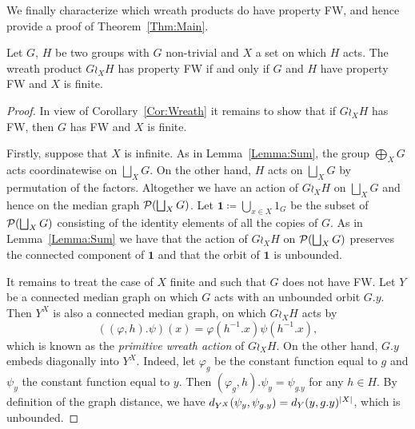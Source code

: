 We finally characterize which wreath products do have property FW, and hence provide a proof of Theorem~\ref{Thm:Main}.
\begin{prop}\label{Prop:Median}
Let $G$, $H$ be two groups with $G$ non-trivial and $X$ a set on which $H$ acts. The wreath product $G \wr_X H$ has property FW if and only if $G$ and $H$ have property FW and $X$ is finite.
\end{prop}
\begin{proof}
In view of Corollary~\ref{Cor:Wreath} it remains to show that if $G\wr_X H$ has FW, then $G$ has FW and $X$ is finite.

Firstly, suppose that $X$ is infinite.
As in Lemma~\ref{Lemma:Sum}, the group $\bigoplus_XG$ acts coordinatewise on  $\bigsqcup_XG$. On the other hand, $H$ acts on $\bigsqcup_XG$ by permutation of the factors.
Altogether we have an action of $G\wr_XH$ on $\bigsqcup_XG$ and hence on the median graph $\mathcal P(\bigsqcup_XG)$.
Let $\mathbf 1\coloneqq\bigcup_{x\in X} 1_{G}$ be the subset of $\mathcal P(\bigsqcup_XG)$ consisting of the identity elements of all the copies of $G$.
As in Lemma~\ref{Lemma:Sum} we have that the action of $G\wr_XH$ on $\mathcal P(\bigsqcup_XG)$ preserves the connected component of $\mathbf 1$
and that the orbit of $\mathbf 1$ is unbounded.

It remains to treat the case of $X$ finite and such that $G$ does not have FW.
Let $Y$ be a connected median graph on which $G$ acts with an unbounded orbit $G.y$.
Then $Y^X$ is also a connected median graph, on which $G\wr_XH$ acts by
\[
((\varphi,h).\psi)(x)=\varphi(h^{-1}.x)\psi(h^{-1}.x),
\]
which is known as the \emph{primitive wreath action} of $G\wr_XH$.
On the other hand, $G.y$ embeds diagonally into $Y^X$.
Indeed, let $\varphi_g$ be the constant function equal to $g$ and $\psi_y$ the constant function equal to $y$. Then $(\varphi_g,h).\psi_y=\psi_{g.y}$ for any $h\in H$.
By definition of the graph distance, we have $d_{Y^X}(\psi_y,\psi_{g.y})=d_Y(y,g.y)^{\lvert X\rvert}$, which is unbounded.

%
\end{proof}

